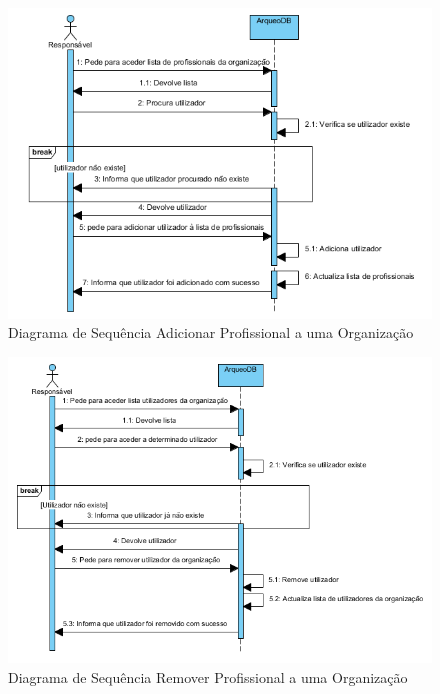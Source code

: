 \documentclass[12pt,a4paper]{article}
\begin{document}
\begin{figure}[h!]
\centering
\includegraphics[scale=1]{sequencia/adicionarprofissional}
\caption{Diagrama de Sequência Adicionar Profissional a uma Organização} 
\end{figure}  


\begin{figure}[h!]
\centering
\includegraphics[scale=1]{sequencia/removerutilizador}
\caption{Diagrama de Sequência Remover Profissional a uma Organização} 
\end{figure}  
\end{document}
